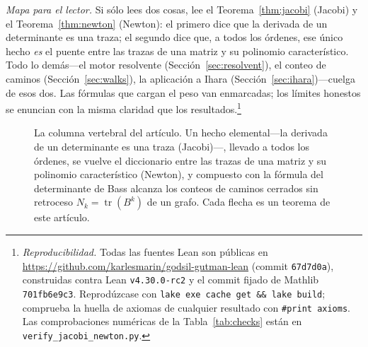 \documentclass[11pt]{article}
\newcommand{\lean}[1]{{\def\_{\textunderscore\allowbreak}\texttt{#1}}}
\newcommand{\tr}{\operatorname{tr}}
\newcommand{\adj}{\operatorname{adj}}
\DeclareMathOperator{\charpolyRev}{charpolyRev}
\begin{document}
\noindent\emph{Mapa para el lector.} Si s\'olo lees dos cosas, lee el Teorema~\ref{thm:jacobi}
(Jacobi) y el Teorema~\ref{thm:newton} (Newton): el primero dice que la derivada de un determinante
es una traza; el segundo dice que, a todos los \'ordenes, ese \'unico hecho \emph{es} el puente entre
las trazas de una matriz y su polinomio caracter\'istico. Todo lo dem\'as---el motor resolvente
(Secci\'on~\ref{sec:resolvent}), el conteo de caminos (Secci\'on~\ref{sec:walks}), la aplicaci\'on a
Ihara (Secci\'on~\ref{sec:ihara})---cuelga de esos dos. Las f\'ormulas que cargan el peso van
enmarcadas; los l\'imites honestos se enuncian con la misma claridad que los resultados.\footnote{\emph{Reproducibilidad.}
Todas las fuentes Lean son p\'ublicas en \url{https://github.com/karlesmarin/godsil-gutman-lean}
(commit \texttt{67d7d0a}), construidas contra Lean \texttt{v4.30.0-rc2} y el commit fijado de Mathlib
\texttt{701fb6e9c3}. Reprod\'uzcase con \texttt{lake exe cache get \&\& lake build}; comprueba la
huella de axiomas de cualquier resultado con \lean{\#print axioms}. Las comprobaciones num\'ericas de
la Tabla~\ref{tab:checks} est\'an en \texttt{verify\_jacobi\_newton.py}.}

\begin{figure}[h]
\centering
{}
\caption{La columna vertebral del art\'iculo. Un hecho elemental---la derivada de un determinante es
una traza (Jacobi)---, llevado a todos los \'ordenes, se vuelve el diccionario entre las trazas de una
matriz y su polinomio caracter\'istico (Newton), y compuesto con la f\'ormula del determinante de
Bass alcanza los conteos de caminos cerrados sin retroceso $N_k=\tr(B^k)$ de un grafo. Cada flecha es
un teorema de este art\'iculo.}
\label{fig:spine}
\end{figure}
\end{document}
